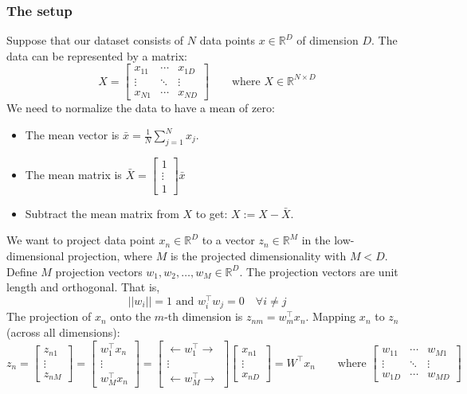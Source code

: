 \documentclass[11pt]{article}
\begin{document}
\subsubsection{The setup}
Suppose that our dataset consists of $N$ data points $x\in\mathbb{R}^D$ of dimension $D$. The data can be represented by a matrix:
$$
X=\begin{bmatrix}
    x_{11} & \cdots & x_{1D} \\
    \vdots & \ddots & \vdots \\
    x_{N1} & \cdots & x_{ND}
\end{bmatrix}
\quad\quad
\text{where }X\in\mathbb{R}^{N\times D}
$$
We need to normalize the data to have a mean of zero:
\begin{itemize}
    \item The mean vector is $\bar{x}=\frac{1}{N}\sum_{j=1}^{N}x_j$.
    \item The mean matrix is $\bar{X}=\begin{bmatrix}
        1 \\
        \vdots \\
        1
    \end{bmatrix}\bar{x}$
    \item Subtract the mean matrix from $X$ to get: $X:=X-\bar{X}$.
\end{itemize}
We want to project data point $x_n\in\mathbb{R}^{D}$ to a vector $z_n\in\mathbb{R}^{M}$ in the low-dimensional projection, where $M$ is the projected dimensionality with $M<D$.
Define $M$ projection vectors $w_1,w_2,\dots,w_M\in\mathbb{R}^{D}$. The projection vectors are unit length and orthogonal. That is,
$$
||w_i||=1\text{ and }w_i^{\top}w_j=0\quad\forall i\neq j
$$
The projection of $x_n$ onto the $m$-th dimension is $z_{nm}=w_m^{\top}x_n$. Mapping $x_n$ to $z_n$ (across all dimensions):
$$
z_n=\begin{bmatrix}
    z_{n1} \\
    \vdots \\
    z_{nM}
\end{bmatrix}
=\begin{bmatrix}
    w_1^{\top}x_n \\
    \vdots \\
    w_M^{\top}x_n
\end{bmatrix}
=\begin{bmatrix}
    \leftarrow w_1^{\top} \rightarrow \\
    \vdots \\
    \leftarrow w_M^{\top} \rightarrow 
\end{bmatrix}
\begin{bmatrix}
    x_{n1} \\
    \vdots \\
    x_{nD}
\end{bmatrix}
=W^{\top}x_n
\quad\quad\text{where }
\begin{bmatrix}
    w_{11} & \cdots & w_{M1} \\
    \vdots & \ddots & \vdots \\
    w_{1D} & \cdots & w_{MD} 
\end{bmatrix}
$$
\end{document}
